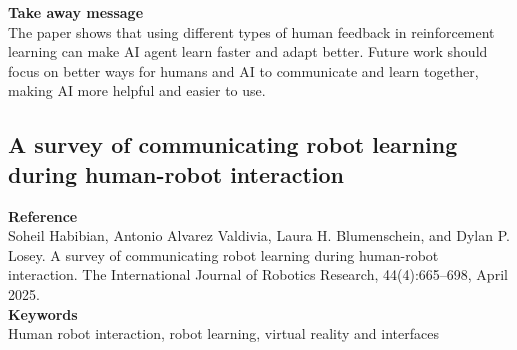 \documentclass[report.tex]{subfiles}
\begin{document}
\noindent\textbf{Take away message}  \\
The paper shows that using different types of human feedback in reinforcement learning can make AI agent learn faster and adapt better. Future work should focus on better ways for humans and AI to communicate and learn together, making AI more helpful and easier to use.













\subsection{A survey of communicating robot learning during human-robot interaction} 

\noindent\textbf{Reference} \\
\cite{habibian_survey_2025}Soheil Habibian, Antonio Alvarez Valdivia, Laura H. Blumenschein, and Dylan P. Losey. A survey of
communicating robot learning during human-robot interaction. The International Journal of Robotics
Research, 44(4):665–698, April 2025.\\


\noindent\textbf{Keywords} \\
Human robot interaction, robot learning, virtual reality and interfaces
   \\
\end{document}
